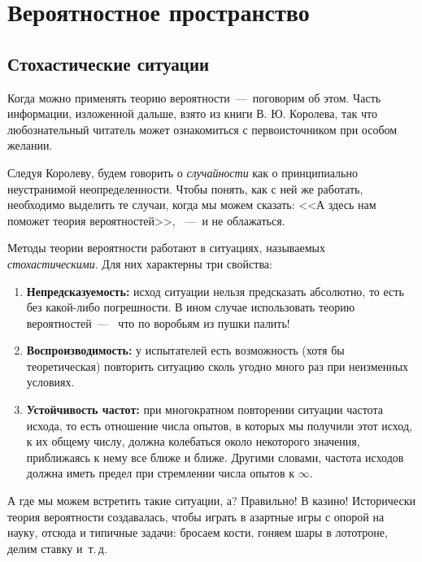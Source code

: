 \documentclass[../TV&MS.tex]{subfiles}
\begin{document}
\section{Вероятностное пространство}

\subsection{Стохастические ситуации}

\qquad Когда можно применять теорию вероятности~---~поговорим об этом.
Часть информации, изложенной дальше, взято из книги \cite{Korolev} В. Ю. Королева, 
так что любознательный читатель может ознакомиться с первоисточником при особом желании.

Следуя Королеву, будем говорить о \emph{случайности} как о принципиально
неустранимой неопределенности. Чтобы понять, как с ней же работать, необходимо
выделить те случаи, когда мы можем сказать: <<А здесь нам поможет теория вероятностей>>,
~---~и не облажаться.

Методы теории вероятности работают в ситуациях, называемых \emph{стохастическими}. 
Для них характерны три свойства:
\begin{enumerate}[label={\bfseries \ding{118}\quad\arabic{enumi}:},leftmargin=*]
	\item \textbf{Непредсказуемость:} исход ситуации нельзя предсказать абсолютно, то
	есть без какой-либо погрешности. В ином случае использовать теорию вероятностей~---~ 
	что по воробьям из пушки палить!
	
	\item \textbf{Воспроизводимость:} у испытателей есть возможность (хотя бы теоретическая) 
	повторить ситуацию сколь угодно много раз при неизменных условиях.
	
	\item \textbf{Устойчивость частот:} при многократном повторении ситуации частота исхода,
	то есть отношение числа опытов, в которых мы получили этот исход, к их общему числу,
	должна колебаться около некоторого значения, приближаясь к нему все ближе и ближе.
	Другими словами, частота исходов должна иметь предел при стремлении
	числа опытов к $\infty$.
\end{enumerate}

А где мы можем встретить такие ситуации, а? Правильно! В казино!
Исторически теория вероятности создавалась, чтобы играть в азартные игры с опорой на науку, 
отсюда и типичные задачи: бросаем кости, гоняем шары в лототроне, делим ставку и~т.\,д.
\end{document}
